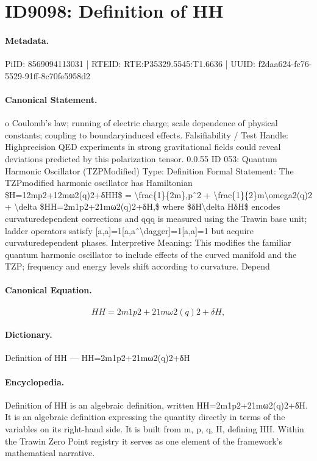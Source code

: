 \section*{ID9098: Definition of HH}
\paragraph{Metadata.}
PiID: 8569094113031 | RTEID: RTE:P35329.5545:T1.6636 | UUID: f2daa624-fc76-5529-91ff-8c70fe5958d2

\paragraph{Canonical Statement.}
o Coulomb’s law; running of electric charge; scale dependence of physical constants; coupling to boundaryinduced effects. Falsifiability / Test Handle: Highprecision QED experiments in strong gravitational fields could reveal deviations predicted by this polarization tensor. 0.0.55 ID 053: Quantum Harmonic Oscillator (TZPModified) Type: Definition Formal Statement: The TZPmodified harmonic oscillator has Hamiltonian \$H=12mp2+12mω2(q)2+δHH\$ = \textbackslash{}frac\{1\}\{2m\},pˆ2 + \textbackslash{}frac\{1\}\{2\}m\textbackslash{}omega2(q)2 + \textbackslash{}delta \$HH=2m1p2+21mω2(q)2+δH,\$ where \$δH\textbackslash{}delta HδH\$ encodes curvaturedependent corrections and qqq is measured using the Trawin base unit; ladder operators satisfy [a,a]=1[a,aˆ\textbackslash{}dagger]=1[a,a]=1 but acquire curvaturedependent phases. Interpretive Meaning: This modifies the familiar quantum harmonic oscillator to include effects of the curved manifold and the TZP; frequency and energy levels shift according to curvature. Depend

\paragraph{Canonical Equation.}
\[
HH=2m1p2+21mω2(q)2+δH,
\]

\paragraph{Dictionary.}
Definition of HH — HH=2m1p2+21mω2(q)2+δH

\paragraph{Encyclopedia.}
Definition of HH is an algebraic definition, written HH=2m1p2+21mω2(q)2+δH. It is an algebraic definition expressing the quantity directly in terms of the variables on its right-hand side. It is built from m, p, q, H, defining HH. Within the Trawin Zero Point registry it serves as one element of the framework's mathematical narrative.
